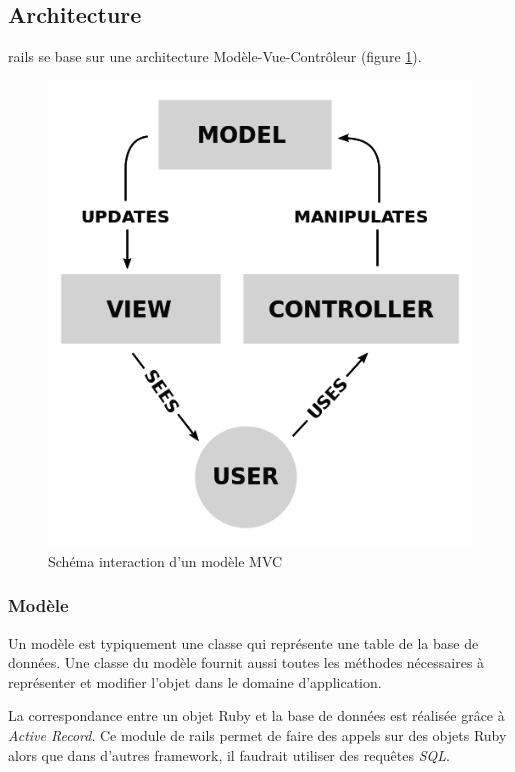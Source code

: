 \subsection{Architecture}
\gls{rails} se base sur une architecture Modèle-Vue-Contrôleur \cite{wiki-mvc} (figure \ref{fig:mvc}).
\begin{figure}[ht]
  \begin{center}
    \includegraphics[scale=0.3]{content/4-prerequis/images/mvc}
    \caption{Schéma interaction d'un modèle MVC}
    \label{fig:mvc}
  \end{center}
\end{figure}
\subsubsection{Modèle}
Un modèle est typiquement une classe qui représente une table de la base de données. Une classe du modèle fournit aussi toutes les méthodes nécessaires à représenter et modifier l'objet dans le domaine d'application.

La correspondance entre un objet Ruby et la base de données est réalisée grâce à \textit{Active Record}. Ce module de \gls{rails} permet de faire des appels sur des objets Ruby alors que dans d'autres framework, il faudrait utiliser des requêtes \textit{SQL}. \label{active-record}


